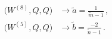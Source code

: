 \begin{equation}
\begin{aligned}
\big(W^{(8)}, Q, Q\big) &\rightarrow \tilde a = \frac{1}{\tilde m
-1}\, ,\\[1ex]
\big(W^{(5)}, Q, Q\big) &\rightarrow \tilde b = \frac{-2}{\tilde n
-1}\, .
\end{aligned}
\end{equation}

